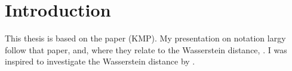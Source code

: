 \section{Introduction}
\label{sec:introduction}

This thesis is based on the paper \textcite{kaji2023adversarial} (KMP).
My presentation on notation largy follow that paper, \textcite{goodfellow2014generative} and, where they relate to the Wasserstein distance, \textcite{arjovsky2017wassersteingan}.
I was inspired to investigate the Wasserstein distance by \textcite{athey2021using}.